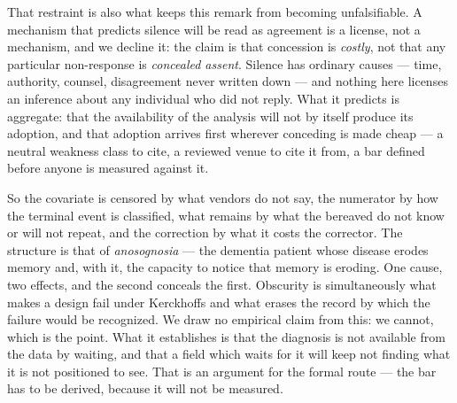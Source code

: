 \begin{remark}
That restraint is also what keeps this remark from becoming unfalsifiable. A mechanism
that predicts silence will be read as agreement is a license, not a mechanism, and we
decline it: the claim is that concession is \emph{costly}, not that any particular
non-response is \emph{concealed assent}. Silence has ordinary causes --- time,
authority, counsel, disagreement never written down --- and nothing here licenses an
inference about any individual who did not reply. What it predicts is aggregate: that
the availability of the analysis will not by itself produce its adoption, and that
adoption arrives first wherever conceding is made cheap --- a neutral weakness class to
cite, a reviewed venue to cite it from, a bar defined before anyone is measured against
it.

So the covariate is censored by what vendors do not say, the numerator by how the
terminal event is classified, what remains by what the bereaved do not know or will not
repeat, and the correction by what it costs the corrector. The structure is that of \emph{anosognosia} --- the dementia patient whose disease
erodes memory and, with it, the capacity to notice that memory is eroding. One
cause, two effects, and the second conceals the first. Obscurity is simultaneously
what makes a design fail under Kerckhoffs and what erases the record by which the
failure would be recognized. We draw no empirical claim from this: we cannot,
which is the point. What it establishes is that the diagnosis is not available
from the data by waiting, and that a field which waits for it will keep not
finding what it is not positioned to see. That is an argument for the formal
route --- the bar has to be derived, because it will not be measured.
\end{remark}
